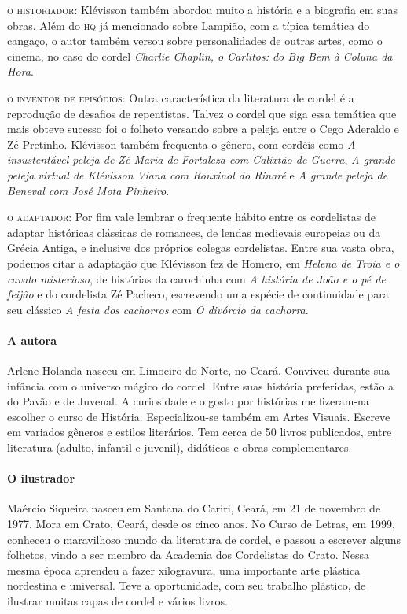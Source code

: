 \documentclass[11pt]{extarticle}
\begin{document}
\noindent\textsc{o historiador}: Klévisson também abordou muito a história e a biografia em suas obras. Além do \textsc{hq} já mencionado sobre Lampião, com a típica temática do cangaço, o autor também versou sobre personalidades de outras artes, como o cinema, no caso do cordel \textit{Charlie Chaplin, o Carlitos: do Big Bem à Coluna da Hora}.

\noindent\textsc{o inventor de episódios}: Outra característica da literatura de cordel é a reprodução de desafios de repentistas. Talvez o cordel que siga essa temática que mais obteve sucesso foi o folheto versando sobre a peleja entre o Cego Aderaldo e Zé Pretinho. Klévisson também frequenta o gênero, com cordéis como \textit{A insustentável
peleja de Zé Maria de Fortaleza com Calixtão de Guerra}, \textit{A grande peleja virtual de Klévisson Viana com Rouxinol do Rinaré} e \textit{A grande peleja de Beneval com José Mota Pinheiro}.

\noindent\textsc{o adaptador}: Por fim vale lembrar o frequente hábito entre os cordelistas de adaptar históricas clássicas de romances, de lendas medievais europeias ou da Grécia Antiga, e inclusive dos próprios colegas cordelistas. Entre sua vasta obra, podemos citar a adaptação que Klévisson fez de Homero, em \textit{Helena de Troia e o cavalo misterioso}, de histórias da carochinha com \textit{A história de João e o pé de feijão} e do cordelista Zé Pacheco, escrevendo uma espécie de continuidade para seu clássico \textit{A festa dos cachorros} com \textit{O divórcio da cachorra}.

\paragraph{A autora}
Arlene Holanda nasceu em Limoeiro do Norte, no Ceará. Conviveu durante sua infância com o universo mágico do cordel. Entre suas história preferidas, estão a do Pavão e de
Juvenal. A curiosidade e o gosto por histórias me fizeram-na escolher o curso de História. Especializou-se também em Artes Visuais. Escreve em variados gêneros e estilos literários. Tem cerca de 50 livros publicados, entre literatura (adulto, infantil e juvenil), didáticos e obras complementares.

\paragraph{O ilustrador}
Maércio Siqueira nasceu em Santana do Cariri, Ceará, em 21 de novembro de 1977.
Mora em Crato, Ceará, desde os cinco anos. No Curso de Letras, em 1999, conheceu o
maravilhoso mundo da literatura de cordel, e passou a escrever alguns
folhetos, vindo a ser membro da Academia dos Cordelistas do Crato.
Nessa mesma época aprendeu a fazer xilogravura, uma importante arte
plástica nordestina e universal. Teve a oportunidade, com seu trabalho plástico, de ilustrar muitas capas de cordel e vários livros.
\end{document}
